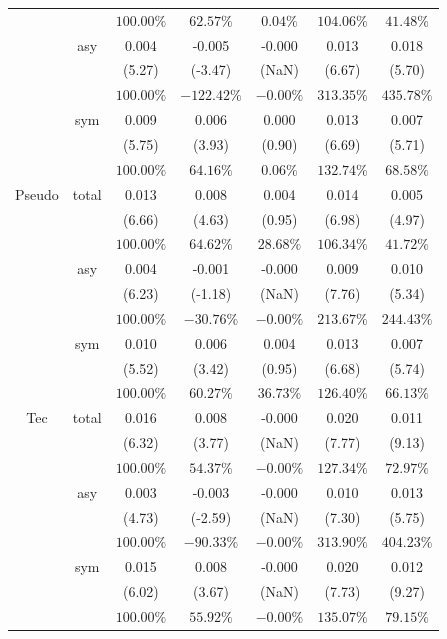 \documentclass[
]{article}
\begin{document}
\begin{table}[H]
{\begin{tabular}{ccccccc}
   &  & $100.00\%$ & $62.57\%$ & $0.04\%$ & $104.06\%$ & $41.48\%$ \\ 
   & asy & 0.004 & -0.005 & -0.000 & 0.013 & 0.018 \\ 
   &  & (5.27) & (-3.47) & (NaN) & (6.67) & (5.70) \\ 
   &  & $100.00\%$ & $-122.42\%$ & $-0.00\%$ & $313.35\%$ & $435.78\%$ \\ 
   & sym & 0.009 & 0.006 & 0.000 & 0.013 & 0.007 \\ 
   &  & (5.75) & (3.93) & (0.90) & (6.69) & (5.71) \\ 
   &  & $100.00\%$ & $64.16\%$ & $0.06\%$ & $132.74\%$ & $68.58\%$ \\ 
   \hline 
Pseudo & total & 0.013 & 0.008 & 0.004 & 0.014 & 0.005 \\ 
   &  & (6.66) & (4.63) & (0.95) & (6.98) & (4.97) \\ 
   &  & $100.00\%$ & $64.62\%$ & $28.68\%$ & $106.34\%$ & $41.72\%$ \\ 
   & asy & 0.004 & -0.001 & -0.000 & 0.009 & 0.010 \\ 
   &  & (6.23) & (-1.18) & (NaN) & (7.76) & (5.34) \\ 
   &  & $100.00\%$ & $-30.76\%$ & $-0.00\%$ & $213.67\%$ & $244.43\%$ \\ 
   & sym & 0.010 & 0.006 & 0.004 & 0.013 & 0.007 \\ 
   &  & (5.52) & (3.42) & (0.95) & (6.68) & (5.74) \\ 
   &  & $100.00\%$ & $60.27\%$ & $36.73\%$ & $126.40\%$ & $66.13\%$ \\ 
   \hline 
Tec & total & 0.016 & 0.008 & -0.000 & 0.020 & 0.011 \\ 
   &  & (6.32) & (3.77) & (NaN) & (7.77) & (9.13) \\ 
   &  & $100.00\%$ & $54.37\%$ & $-0.00\%$ & $127.34\%$ & $72.97\%$ \\ 
   & asy & 0.003 & -0.003 & -0.000 & 0.010 & 0.013 \\ 
   &  & (4.73) & (-2.59) & (NaN) & (7.30) & (5.75) \\ 
   &  & $100.00\%$ & $-90.33\%$ & $-0.00\%$ & $313.90\%$ & $404.23\%$ \\ 
   & sym & 0.015 & 0.008 & -0.000 & 0.020 & 0.012 \\ 
   &  & (6.02) & (3.67) & (NaN) & (7.73) & (9.27) \\ 
   &  & $100.00\%$ & $55.92\%$ & $-0.00\%$ & $135.07\%$ & $79.15\%$ \\ 
   \hline 
\end{tabular}
}
\end{table}
\end{document}
